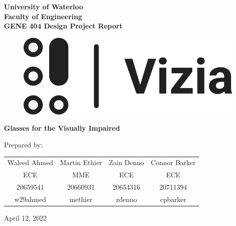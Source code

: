 \documentclass[a4paper,11pt]{article}
\begin{document}

\begin{titlingpage}
    \begin{center}
        {\huge\bfseries%
            University of Waterloo \\
        }
        \vspace{1em}
        {\Large\bfseries%
            Faculty of Engineering \\
            \vspace{1em}
            GENE 404 Design Project Report \\
        }
        
        \vspace{10em}
    
        \begin{figure}[H]
            \centering
            \includegraphics[scale=0.45]{img/logo_text_dark.png}
        \end{figure}
        {\Huge\bfseries%
            Glasses for the Visually Impaired \\[0.5em]
        }

        \vspace{10em}
        
        Prepared by: \\
        \vspace{1em}
        \begin{tabular}{cccc}
            Waleed Ahmed & Martin Ethier & Zain Denno & Connor Barker \\
            ECE & MME & ECE & ECE \\
            20659541 & 20660931 & 20654316 & 20711394 \\
            w29ahmed & methier & zdenno & cpbarker
        \end{tabular}
        
        \vspace{9em}
        April 12, 2022
    \end{center}
\end{titlingpage}
\end{document}
